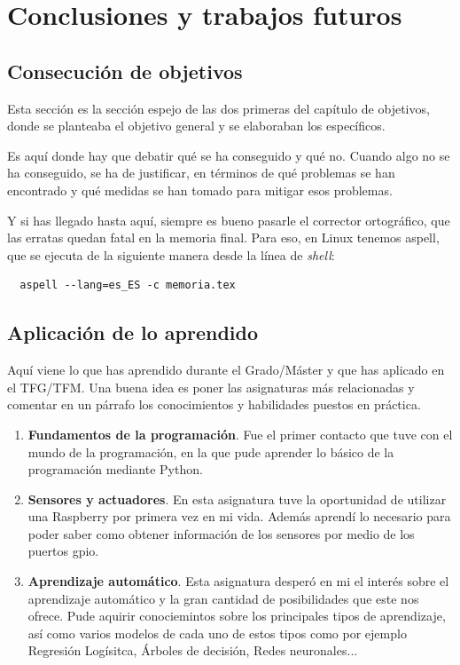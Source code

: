 \documentclass[a4paper, 12pt]{book}
\begin{document}
\chapter{Conclusiones y trabajos futuros}
\label{chap:conclusiones}


\section{Consecución de objetivos}
\label{sec:consecucion-objetivos}

Esta sección es la sección espejo de las dos primeras del capítulo de objetivos, donde se planteaba el objetivo general y se elaboraban los específicos.

Es aquí donde hay que debatir qué se ha conseguido y qué no. 
Cuando algo no se ha conseguido, se ha de justificar, en términos de qué problemas se han encontrado y qué medidas se han tomado para mitigar esos problemas.

Y si has llegado hasta aquí, siempre es bueno pasarle el corrector ortográfico, que las erratas quedan fatal en la memoria final.
Para eso, en Linux tenemos aspell, que se ejecuta de la siguiente manera desde la línea de \emph{shell}:

\begin{verbatim}
  aspell --lang=es_ES -c memoria.tex
\end{verbatim}

\section{Aplicación de lo aprendido}
\label{sec:aplicacion}

Aquí viene lo que has aprendido durante el Grado/Máster y que has aplicado en el TFG/TFM. Una buena idea es poner las asignaturas más relacionadas y comentar en un párrafo los conocimientos y habilidades puestos en práctica.

\begin{enumerate}
    \item \textbf{Fundamentos de la programación}. Fue el primer contacto que tuve con el mundo de la programación, en la que pude aprender lo básico de la programación mediante Python.

    \item \textbf{Sensores y actuadores}. En esta asignatura tuve la oportunidad de utilizar una Raspberry por primera vez en mi vida. Además aprendí lo necesario para poder saber como obtener información de los sensores por medio de los puertos gpio.
    
    \item \textbf{Aprendizaje automático}. Esta asignatura desperó en mi el interés sobre el aprendizaje automático y la gran cantidad de posibilidades que este nos ofrece. Pude aquirir conociemintos sobre los principales tipos de aprendizaje, así como varios modelos de cada uno de estos tipos como por ejemplo Regresión Logísitca, Árboles de decisión, Redes neuronales...

\end{enumerate}
\end{document}
